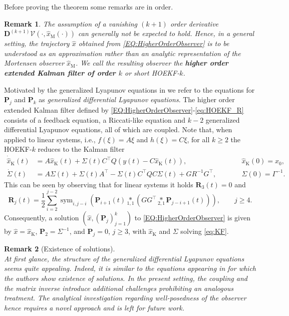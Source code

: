 \documentclass[11pt,reqno]{amsart}
\numberwithin{equation}{section}
\theoremstyle{plain}
\newtheorem{remark}{Remark}
\DeclareMathOperator{\Sym}{sym}
\newcommand{\tenp}[2]{\underset{#1,#2}{*}}
\newcommand{\TenDeriv}[1]{\mathbf{D}^{(#1)}}
\begin{document}
%
Before proving the theorem some remarks are in order.
%
\begin{remark}\label{rem:HOEKF}
    The assumption of a vanishing $(k+1)$ order derivative $\TenDeriv{k+1} \mathcal{V}(\cdot,\widehat{x}_\mathrm{M}(\cdot))$ can generally not be expected to hold. Hence, in a general setting, the trajectory $\widehat{x}$ obtained from \eqref{EQ:HigherOrderObserver} is to be understood as an approximation rather than an analytic representation of the Mortensen observer $\widehat{x}_\mathrm{M}$.
    We call the resulting observer the \textbf{higher order extended Kalman filter of order $k$} or short \emph{HOEKF}-$k$.
\end{remark}
%
Motivated by the generalized Lyapunov equations in \cite{BreKP19} we refer to the equations for $\mathbf{P}_j$ and $\mathbf{P}_k$ as \emph{generalized differential Lyapunov equations}.
The higher order extended Kalman filter defined by \eqref{EQ:HigherOrderObserver}-\eqref{eq:HOEKF_R} consists of a feedback equation, a Riccati-like equation and $k-2$ generalized differential Lyapunov equations, all of which are coupled. 
%
Note that, when applied to linear systems, i.e., $f(\xi) = A \xi$ and $h(\xi) = C \xi$, for all $k \geq 2$ the HOEKF-$k$ reduces to the Kalman filter
%
\begin{equation}\label{eq:KF}
\begin{alignedat}{2}
    \dot{\widehat{x}}_\mathrm{K}(t) &= A \widehat{x}_\mathrm{K}(t) + \Sigma(t) C^\top Q (y(t) - C\widehat{x}_\mathrm{K}(t)),
    \qquad \qquad
    &&\widehat{x}_\mathrm{K}(0) = x_0,\\
    \dot{\Sigma}(t) &= A \Sigma(t) + \Sigma(t) A^\top - \Sigma(t) C^\top Q C \Sigma(t) + G R^{-1} G^\top,
    \qquad
    &&\Sigma(0) = \Gamma^{-1}.
\end{alignedat}
\end{equation}
%
This can be seen by observing that for linear systems it holds $\mathbf{R}_3(t) = 0$ and  
%
\begin{equation*}
    \mathbf{R}_j(t) 
    =
    \frac{1}{2} \sum_{i=2}^{j-2} \Sym_{i,j-i} \left( \mathbf{P}_{i+1}(t) \tenp{1}{1} \left( GG^\top \tenp{2}{1} \mathbf{P}_{j-i+1}(t) \right) \right),
    \qquad j\geq 4. 
\end{equation*}
%
Consequently, a solution $(\widehat{x},(\mathbf{P}_j)_{j=1}^k)$ to \eqref{EQ:HigherOrderObserver} is given by $\widehat{x} = \widehat{x}_\mathrm{K}$, $\mathbf{P}_2 = \Sigma^{-1}$, and  $\mathbf{P}_j = 0$, $j \geq 3$, with $\widehat{x}_\mathrm{K}$ and $\Sigma$ solving \eqref{eq:KF}.
%
\begin{remark}[Existence of solutions]~\\
At first glance, the structure of the generalized differential Lyapunov equations seems quite appealing. Indeed, it is similar to the equations appearing in \cite{BreKP19} for which the authors show existence of solutions. In the present setting, the coupling and the matrix inverse introduce additional challenges prohibiting an analogous treatment. The analytical investigation regarding well-posedness of the observer hence requires a novel approach and is left for future work.

\end{remark}
%
\end{document}
